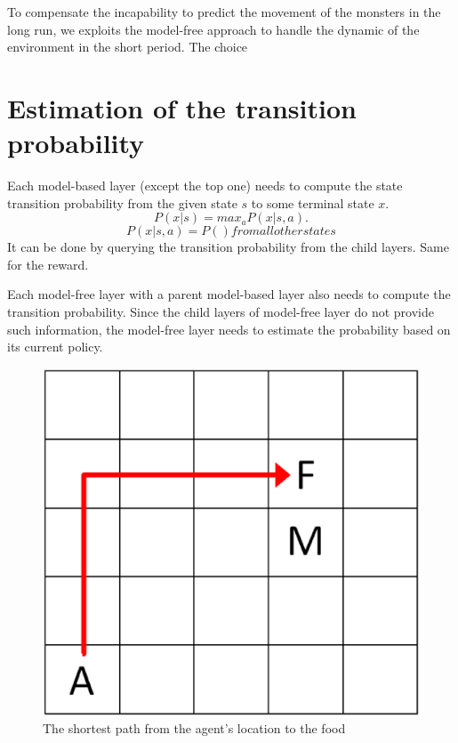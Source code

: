 To compensate the incapability to predict the movement of the monsters in the long run, 
we exploits the model-free approach to handle the dynamic of the environment in the short period.
The choice

\section{Estimation of the transition probability}

Each model-based layer (except the top one) needs to compute the state transition probability
from the given state $s$ to some terminal state $x$.
\begin{equation}
    P(x|s) = max_a P(x|s, a).
\end{equation}
\begin{equation}
    P(x|s, a) = P() from all other states
\end{equation}
It can be done by querying the transition probability from the child layers.
Same for the reward.

Each model-free layer with a parent model-based layer also needs to compute the transition probability.
Since the child layers of model-free layer do not provide such information, the model-free layer
needs to estimate the probability based on its current policy.

\begin{figure}[h]
    \centering
    \begin{minipage}[t]{0.6\linewidth}
        \centering
        \includegraphics[width=\textwidth] {./figures/monsterPlan.eps}
    \end{minipage}
    \caption{The shortest path from the agent's location to the food}
    \label{fig:MonsterPlan}
\end{figure}

